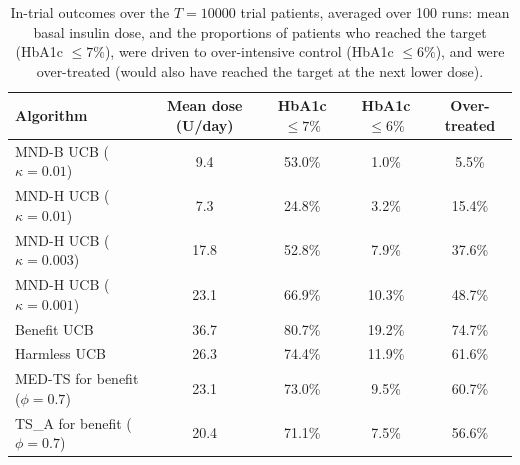 \begin{table}[tb]
\centering
\caption{In-trial outcomes over the $T=10000$ trial patients, averaged over 100 runs: mean basal insulin dose, and the proportions of patients who reached the target (HbA1c $\le7\%$), were driven to over-intensive control (HbA1c $\le6\%$), and were over-treated (would also have reached the target at the next lower dose).}
\label{tab:nhanes_clinical}
\small
\begin{tabular}{lcccc}
\hline
Algorithm & Mean dose (U/day) & HbA1c $\le7\%$ & HbA1c $\le6\%$ & Over-treated \\
\hline
MND-B UCB ($\kappa=0.01$) & 9.4 & 53.0\% & 1.0\% & 5.5\% \\
MND-H UCB ($\kappa=0.01$) & 7.3 & 24.8\% & 3.2\% & 15.4\% \\
MND-H UCB ($\kappa=0.003$) & 17.8 & 52.8\% & 7.9\% & 37.6\% \\
MND-H UCB ($\kappa=0.001$) & 23.1 & 66.9\% & 10.3\% & 48.7\% \\
Benefit UCB & 36.7 & 80.7\% & 19.2\% & 74.7\% \\
Harmless UCB & 26.3 & 74.4\% & 11.9\% & 61.6\% \\
MED-TS for benefit ($\phi=0.7$) & 23.1 & 73.0\% & 9.5\% & 60.7\% \\
TS\_A for benefit ($\phi=0.7$) & 20.4 & 71.1\% & 7.5\% & 56.6\% \\
\hline
\end{tabular}
\end{table}
